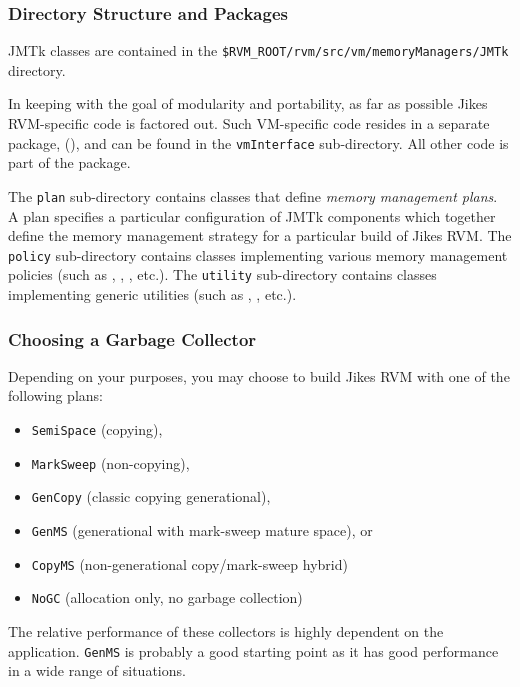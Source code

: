 \subsubsection{Directory Structure and Packages} \label{sssec:directories}

JMTk classes are contained in the
\texttt{\$RVM\_ROOT/rvm/src/vm/memoryManagers/JMTk} directory.

In keeping with the goal of modularity and portability, as far as
possible Jikes RVM-specific code is factored out.  Such VM-specific
code resides in a separate package,
(),
and can be found in the \texttt{vmInterface} sub-directory.  All other
code is part of the
package.

The \texttt{plan} sub-directory contains classes that define
\emph{memory management plans}.  A plan specifies a particular
configuration of JMTk components which together define the memory
management strategy for a particular build of Jikes RVM.  The
\texttt{policy} sub-directory contains classes implementing various
memory management policies (such as , , , etc.).  The \texttt{utility}
sub-directory contains classes implementing generic utilities (such as
,
, etc.).

\subsubsection{Choosing a Garbage Collector} \label{ssec:choosinggc}

Depending on your purposes, you may choose to build Jikes RVM with one
of the following plans:
\begin{itemize}
\item \texttt{SemiSpace} (copying),
\item \texttt{MarkSweep} (non-copying),
\item \texttt{GenCopy} (classic copying generational),
\item \texttt{GenMS} (generational with mark-sweep mature space), or
\item \texttt{CopyMS} (non-generational copy/mark-sweep hybrid)
\item \texttt{NoGC} (allocation only, no garbage collection)
\end{itemize}
The relative performance of these collectors is highly dependent on
the application.  \texttt{GenMS} is probably a good starting point as
it has good performance in a wide range of situations.

